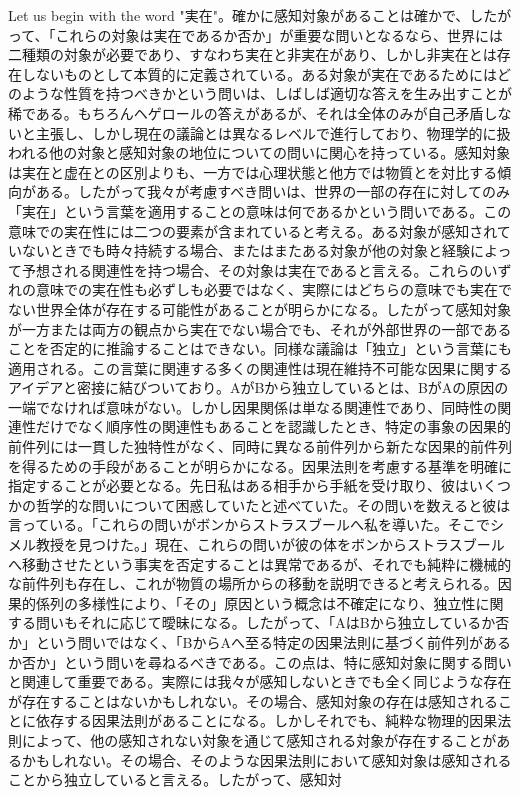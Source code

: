 \documentclass[a4paper,11pt,openany]{ltjsbook}
\begin{document}
Let us begin with the word "実在"。確かに感知対象があることは確かで、したがって、「これらの対象は実在であるか否か」が重要な問いとなるなら、世界には二種類の対象が必要であり、すなわち実在と非実在があり、しかし非実在とは存在しないものとして本質的に定義されている。ある対象が実在であるためにはどのような性質を持つべきかという問いは、しばしば適切な答えを生み出すことが稀である。もちろんヘゲロールの答えがあるが、それは全体のみが自己矛盾しないと主張し、しかし現在の議論とは異なるレベルで進行しており、物理学的に扱われる他の対象と感知対象の地位についての問いに関心を持っている。感知対象は実在と虚在との区別よりも、一方では心理状態と他方では物質とを対比する傾向がある。したがって我々が考慮すべき問いは、世界の一部の存在に対してのみ「実在」という言葉を適用することの意味は何であるかという問いである。この意味での実在性には二つの要素が含まれていると考える。ある対象が感知されていないときでも時々持続する場合、またはまたある対象が他の対象と経験によって予想される関連性を持つ場合、その対象は実在であると言える。これらのいずれの意味での実在性も必ずしも必要ではなく、実際にはどちらの意味でも実在でない世界全体が存在する可能性があることが明らかになる。したがって感知対象が一方または両方の観点から実在でない場合でも、それが外部世界の一部であることを否定的に推論することはできない。同様な議論は「独立」という言葉にも適用される。この言葉に関連する多くの関連性は現在維持不可能な因果に関するアイデアと密接に結びついており。AがBから独立しているとは、BがAの原因の一端でなければ意味がない。しかし因果関係は単なる関連性であり、同時性の関連性だけでなく順序性の関連性もあることを認識したとき、特定の事象の因果的前件列には一貫した独特性がなく、同時に異なる前件列から新たな因果的前件列を得るための手段があることが明らかになる。因果法則を考慮する基準を明確に指定することが必要となる。先日私はある相手から手紙を受け取り、彼はいくつかの哲学的な問いについて困惑していたと述べていた。その問いを数えると彼は言っている。「これらの問いがボンからストラスブールへ私を導いた。そこでシメル教授を見つけた。」現在、これらの問いが彼の体をボンからストラスブールへ移動させたという事実を否定することは異常であるが、それでも純粋に機械的な前件列も存在し、これが物質の場所からの移動を説明できると考えられる。因果的係列の多様性により、「その」原因という概念は不確定になり、独立性に関する問いもそれに応じて曖昧になる。したがって、「AはBから独立しているか否か」という問いではなく、「BからAへ至る特定の因果法則に基づく前件列があるか否か」という問いを尋ねるべきである。この点は、特に感知対象に関する問いと関連して重要である。実際には我々が感知しないときでも全く同じような存在が存在することはないかもしれない。その場合、感知対象の存在は感知されることに依存する因果法則があることになる。しかしそれでも、純粋な物理的因果法則によって、他の感知されない対象を通じて感知される対象が存在することがあるかもしれない。その場合、そのような因果法則において感知対象は感知されることから独立していると言える。したがって、感知対
\end{document}
